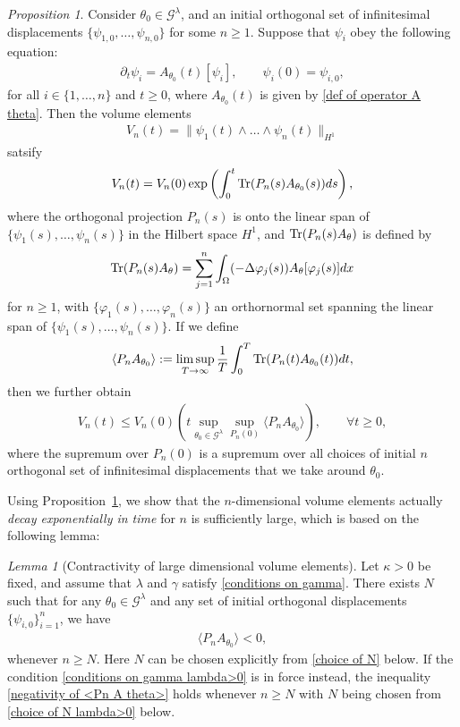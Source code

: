 \documentclass[reqno]{amsart}%
\theoremstyle{definition}
\theoremstyle{remark}
\numberwithin{equation}{section}
\newtheorem{lemma}[theorem]{Lemma}
\newtheorem{proposition}[theorem]{Proposition}
\newcommand{\dt}{\partial_t}
\newcommand{\1}{\mathbf{1}}
\newcommand{\Gg}{\mathcal{G}^{\lambda}}
\newcommand{\Tr}{\text{\rm Tr}}
\numberwithin{equation}{section}
\numberwithin{theorem}{section}
\numberwithin{figure}{section}
\begin{document}
\begin{proposition}\label{volume decay prop}
Consider $\theta_0\in\Gg$, and an initial orthogonal set of infinitesimal displacements $\{\psi_{1,0},\dots,\psi_{n,0}\}$ for some $n\ge1$. Suppose that $\psi_i$ obey the following equation:
\begin{align}
\dt\psi_i=A_{\theta_0}(t)[\psi_i],\qquad \psi_i(0)=\psi_{i,0},
\end{align}
for all $i\in\{1,\dots, n\}$ and $t\ge0$, where $A_{\theta_0}(t)$ is given by \eqref{def of operator A theta}. Then the volume elements
\begin{align*}
V_n(t)=\|\psi_1(t)\wedge\dots\wedge\psi_n(t)\|_{H^1}
\end{align*}
satsify
\begin{align*}
V_n(t)=V_n(0)\exp\left(\int_0^t \Tr(P_n(s)A_{\theta_0}(s))ds\right),
\end{align*}
where the orthogonal projection $P_n(s)$ is onto the linear span of $\{\psi_1(s),\dots,\psi_n(s)\}$ in the Hilbert space $H^1$, and $\Tr(P_n(s)A_{\theta})$ is defined by 
\[\Tr(P_n(s)A_{\theta}) = \sum_{j=1}^n\int_{\Omega}(-\Delta\varphi_j(s))A_{\theta}[\varphi_j(s)]dx\]
for $n\ge1$, with $\{\varphi_1(s),\dots,\varphi_n(s)\}$ an orthornormal set spanning the linear span of $\{\psi_1(s),\dots,\psi_n(s)\}$. If we define
\begin{align*}
\langle P_nA_{\theta_0}\rangle:=\limsup_{T\to\infty}\frac{1}{T}\int_0^T\Tr(P_n(t)A_{\theta_0}(t))dt,
\end{align*}
then we further obtain
\begin{align}\label{volume decay}
V_n(t)\le V_n(0)\left(t\sup_{\theta_0\in\Gg}\sup_{P_n(0)}\langle P_nA_{\theta_0}\rangle\right),\qquad \forall t\ge0,
\end{align}
where the supremum over $P_n(0)$ is a supremum over all choices of initial $n$ orthogonal set of infinitesimal displacements that we take around $\theta_0$.
\end{proposition}
Using Proposition~\ref{volume decay prop}, we show that the $n$-dimensional volume elements actually {\it decay exponentially in time} for $n$ is sufficiently large, which is based on the following lemma:

\begin{lemma}[Contractivity of large dimensional volume elements]\label{Contractivity of large dimensional volume elements lemma}
Let $\kappa>0$ be fixed, and assume that $\lambda$ and $\gamma$ satisfy \eqref{conditions on gamma}. There exists $N$ such that for any $\theta_0\in\Gg$ and any set of initial orthogonal displacements $\{\psi_{i,0}\}_{i=1}^n$, we have
\begin{align}\label{negativity of <Pn A theta>}
\langle P_nA_{\theta_0}\rangle<0,
\end{align}
whenever $n\ge N$. Here $N$ can be chosen explicitly from \eqref{choice of N} below. If the condition \eqref{conditions on gamma lambda>0} is in force instead, the inequality \eqref{negativity of <Pn A theta>} holds whenever $n\ge N$ with $N$ being chosen from \eqref{choice of N lambda>0} below.
\end{lemma}
\end{document}
